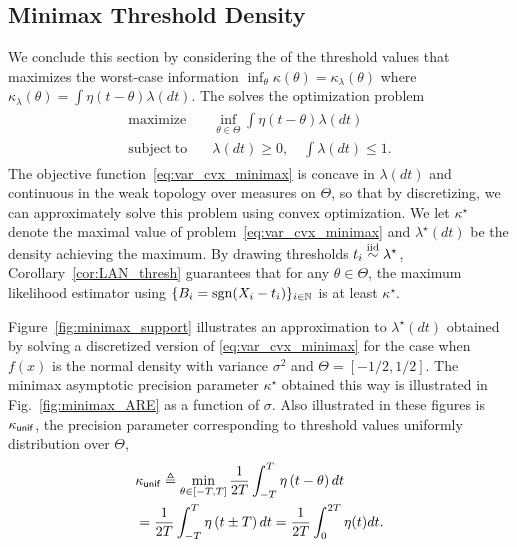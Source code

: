 

\subsection{Minimax Threshold Density}

We conclude this section by considering the  of the threshold values
that maximizes the worst-case information $\inf_\theta \kappa(\theta)
= \kappa_\lambda(\theta)$ where $\kappa_\lambda(\theta)
= \int \eta(t - \theta) \lambda(dt)$.
The  solves the
optimization problem
\begin{align}
  \label{eq:var_cvx_minimax}
  \begin{split}
    \mathrm{maximize} \quad &  \inf_{\theta \in \Theta} \int \eta(t-\theta) \lambda(dt)
    \\ 
    \mathrm{subject~to} 
    \quad & \lambda(dt)\geq 0,\quad \int \lambda(dt) \leq 1. 
  \end{split}
\end{align}
The objective function~\eqref{eq:var_cvx_minimax} is concave in
$\lambda(dt)$ and continuous in the weak topology over measures on $\Theta$,
so that by discretizing, we can approximately solve this problem using
convex optimization. We let $\kappa^\star$ denote the maximal value of
problem~\eqref{eq:var_cvx_minimax} and $\lambda^\star(dt)$ be the density
achieving the maximum. By drawing thresholds
$t_i \stackrel{\textup{iid}}{\sim} \lambda^\star$,
Corollary~\ref{cor:LAN_thresh} guarantees that for any $\theta \in \Theta$, the
maximum likelihood estimator
using $\{B_i = \mathrm{sgn}(X_i - t_i)\}_{i \in \mathbb{N}}$ is at least $\kappa^\star$. \par
%
Figure~\ref{fig:minimax_support} illustrates an approximation to
$\lambda^\star(dt)$ obtained by solving a discretized version of
\eqref{eq:var_cvx_minimax} for the case when $f(x)$ is the normal density
with variance $\sigma^2$ and $\Theta = [-1/2,1/2]$. The minimax asymptotic
precision parameter $\kappa^\star$ obtained this way is illustrated in
Fig.~\ref{fig:minimax_ARE} as a function of $\sigma$. Also
illustrated in these figures is $\kappa_{\mathsf{unif}}$, the precision
parameter corresponding to threshold values uniformly distribution over
$\Theta$,
\begin{align}
& \kappa_{\mathsf{unif}} \triangleq \min_{\theta \in [-T,T]} \frac{1}{2T}\int_{-T}^T \eta\left(t-\theta\right) dt \nonumber
 \\
& = 
\frac{1}{2T}\int_{-T}^{T} \eta\left(t\pm T\right) dt
= \frac{1}{2T}\int_{0}^{2T} \eta(t) dt  \label{eq:uniform_risk}. 
\end{align}


